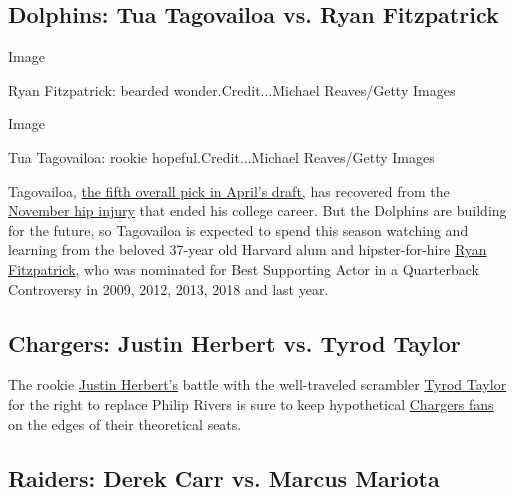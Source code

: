 \hypertarget{dolphins-tua-tagovailoa-vs-ryan-fitzpatrick}{%
\subsection{Dolphins: Tua Tagovailoa vs. Ryan
Fitzpatrick}\label{dolphins-tua-tagovailoa-vs-ryan-fitzpatrick}}

Image

Ryan Fitzpatrick: bearded wonder.Credit...Michael Reaves/Getty Images

Image

Tua Tagovailoa: rookie hopeful.Credit...Michael Reaves/Getty Images

Tagovailoa,
\href{https://www.nytimes3xbfgragh.onion/2020/04/23/sports/football/nfl-draft-live.html\#link-1311ed4c}{the
fifth overall pick in April's draft,} has recovered from the
\href{https://www.nytimes3xbfgragh.onion/2019/11/16/sports/ncaafootball/tua-tagovailoa-carted-off-injury-mississippi-state.html}{November
hip injury} that ended his college career. But the Dolphins are building
for the future, so Tagovailoa is expected to spend this season watching
and learning from the beloved 37-year old Harvard alum and
hipster-for-hire
\href{https://www.nytimes3xbfgragh.onion/2018/09/24/sports/ryan-fitzpatrick-bucs-fitzmagic.html}{Ryan
Fitzpatrick}, who was nominated for Best Supporting Actor in a
Quarterback Controversy in 2009, 2012, 2013, 2018 and last year.

\hypertarget{chargers-justin-herbert-vs-tyrod-taylor}{%
\subsection{Chargers: Justin Herbert vs. Tyrod
Taylor}\label{chargers-justin-herbert-vs-tyrod-taylor}}

The rookie
\href{https://www.nytimes3xbfgragh.onion/article/justin-herbert.html}{Justin
Herbert's} battle with the well-traveled scrambler
\href{https://www.nytimes3xbfgragh.onion/2015/10/04/sports/football/tyrod-taylor-goes-from-a-protege-to-a-productive-quarterback.html}{Tyrod
Taylor} for the right to replace Philip Rivers is sure to keep
hypothetical
\href{https://www.nytimes3xbfgragh.onion/2019/12/19/sports/football/if-the-chargers-score-and-no-ones-there-to-cheer-does-the-owner-care.html}{Chargers
fans} on the edges of their theoretical seats.

\hypertarget{raiders-derek-carr-vs-marcus-mariota}{%
\subsection{Raiders: Derek Carr vs. Marcus
Mariota}\label{raiders-derek-carr-vs-marcus-mariota}}

